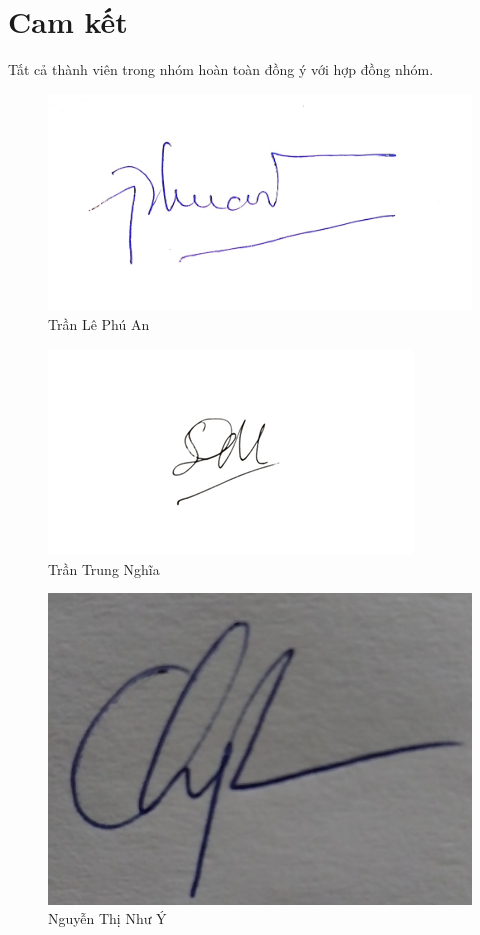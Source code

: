 \documentclass[../main-report.tex]{subfiles}
\begin{document}
\section{Cam kết}
Tất cả thành viên trong nhóm hoàn toàn đồng ý với hợp đồng nhóm.
\begin{figure}[ht]
    \centering
    \includegraphics[scale=0.1]{chapters/hinh/PhuAn.jpg}
    \caption{Trần Lê Phú An}
\end{figure}
\begin{figure}[ht]
    \centering
    \includegraphics[scale=0.6]{chapters/hinh/Nghia.png}
    \caption{Trần Trung Nghĩa}
\end{figure}
\begin{figure}[ht]
    \centering
    \includegraphics[scale=0.1]{chapters/hinh/NhuY.jpg}
    \caption{Nguyễn Thị Như Ý}
\end{figure}
\end{document}
